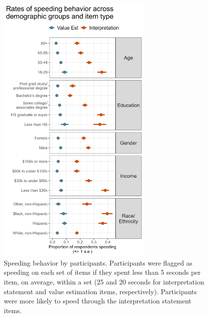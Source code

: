 \documentclass{IEEEcsmag}
\begin{document}
\begin{figure}


\includegraphics[width=18pc]{images/speeding.png}
\caption{Speeding behavior by participants. Participants were flagged as speeding on each set of items if they spent less than 5 seconds per item, on average, within a set (25 and 20 seconds for interpretation statement and value estimation items, respectively). Participants were more likely to speed through the interpretation statement items.}
\end{figure}
\end{document}
